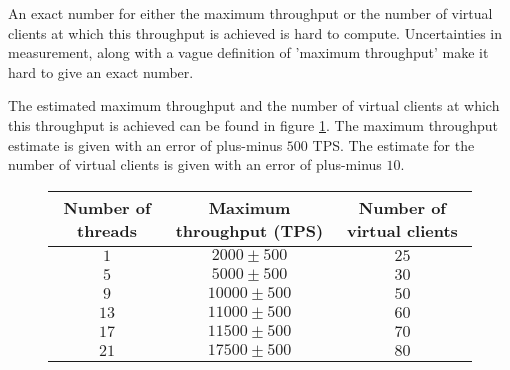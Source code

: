 \documentclass[11pt]{article}
\begin{document}
An exact number for either the maximum throughput or the number of virtual clients at which this throughput is achieved is hard to compute.
Uncertainties in measurement, along with a vague definition of 'maximum throughput' make it hard to give an exact number.

The estimated maximum throughput and the number of virtual clients at which this throughput is achieved can be found in figure \ref{fig:maximum-throughput-numbers}.
The maximum throughput estimate is given with an error of plus-minus $500$ TPS.
The estimate for the number of virtual clients is given with an error of plus-minus $10$.

\begin{figure}[H]
  \centering
  \begin{tabular}{c|c|c}
    Number of threads & Maximum throughput (TPS) & Number of virtual clients \\
    \hline $1$ & $2000 \pm 500$ & $25$ \\
    \hline $5$ & $5000 \pm 500$ & $30$ \\
    \hline $9$ & $10000 \pm 500$ & $50$ \\
    \hline $13$ & $11000 \pm 500$ & $60$ \\
    \hline $17$ & $11500 \pm 500$ & $70$ \\
    \hline $21$ & $17500 \pm 500$ & $80$ \\
  \end{tabular}
  \label{fig:maximum-throughput-numbers}
\end{figure}
\end{document}
